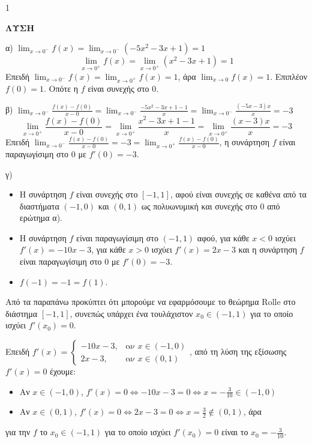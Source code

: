 \begin{ylh}{1}
    \item [Ύλη από εικόνα]
\end{ylh}
\textbf{ΛΥΣΗ}

\begin{alist}
    \item [] α) $\lim_{x\to 0^-} f(x) = \lim_{x\to 0^-} (-5x^2 - 3x + 1) = 1$
    \[ \lim_{x\to 0^+} f(x) = \lim_{x\to 0^+} (x^2 - 3x + 1) = 1 \]
    Επειδή $\lim_{x\to 0^-} f(x) = \lim_{x\to 0^+} f(x) = 1$, άρα $\lim_{x\to 0} f(x) = 1$.
    Επιπλέον $f(0)=1$. Οπότε η $f$ είναι συνεχής στο 0.

    \item [] β) $\lim_{x\to 0^-} \frac{f(x)-f(0)}{x-0} = \lim_{x\to 0^-} \frac{-5x^2 - 3x + 1 - 1}{x} = \lim_{x\to 0^-} \frac{(-5x-3)x}{x} = -3$
    \[ \lim_{x\to 0^+} \frac{f(x)-f(0)}{x-0} = \lim_{x\to 0^+} \frac{x^2 - 3x + 1 - 1}{x} = \lim_{x\to 0^+} \frac{(x-3)x}{x} = -3 \]
    Επειδή $\lim_{x\to 0^-} \frac{f(x)-f(0)}{x-0} = -3 = \lim_{x\to 0^+} \frac{f(x)-f(0)}{x-0}$, η συνάρτηση $f$ είναι παραγωγίσιμη στο 0 με $f'(0)=-3$.

    \item [] γ)
    \begin{itemize}
        \item Η συνάρτηση $f$ είναι συνεχής στο $[-1,1]$, αφού είναι συνεχής σε καθένα από τα διαστήματα $(-1,0)$ και $(0,1)$ ως πολυωνυμική και συνεχής στο 0 από ερώτημα α).
        \item Η συνάρτηση $f$ είναι παραγωγίσιμη στο $(-1,1)$ αφού, για κάθε $x < 0$ ισχύει $f'(x) = -10x - 3$, για κάθε $x > 0$ ισχύει $f'(x) = 2x - 3$ και η συνάρτηση $f$ είναι παραγωγίσιμη στο 0 με $f'(0)=-3$.
        \item $f(-1)=-1=f(1)$.
    \end{itemize}
    Από τα παραπάνω προκύπτει ότι μπορούμε να εφαρμόσουμε το θεώρημα Rolle στο διάστημα $[-1,1]$, συνεπώς υπάρχει ένα τουλάχιστον $x_0 \in (-1,1)$ για το οποίο ισχύει $f'(x_0)=0$.

    Επειδή $f'(x) = \begin{cases} -10x - 3, & \text{αν } x \in (-1,0) \\ 2x - 3, & \text{αν } x \in (0,1) \end{cases}$, από τη λύση της εξίσωσης $f'(x)=0$ έχουμε:
    \begin{itemize}
        \item Αν $x \in (-1,0)$, $f'(x)=0 \Leftrightarrow -10x-3=0 \Leftrightarrow x = -\frac{3}{10} \in (-1,0)$
        \item Αν $x \in (0,1)$, $f'(x)=0 \Leftrightarrow 2x-3=0 \Leftrightarrow x = \frac{3}{2} \notin (0,1)$, άρα
    \end{itemize}
    για την $f$ το $x_0 \in (-1,1)$ για το οποίο ισχύει $f'(x_0)=0$ είναι το $x_0 = -\frac{3}{10}$.
\end{alist}